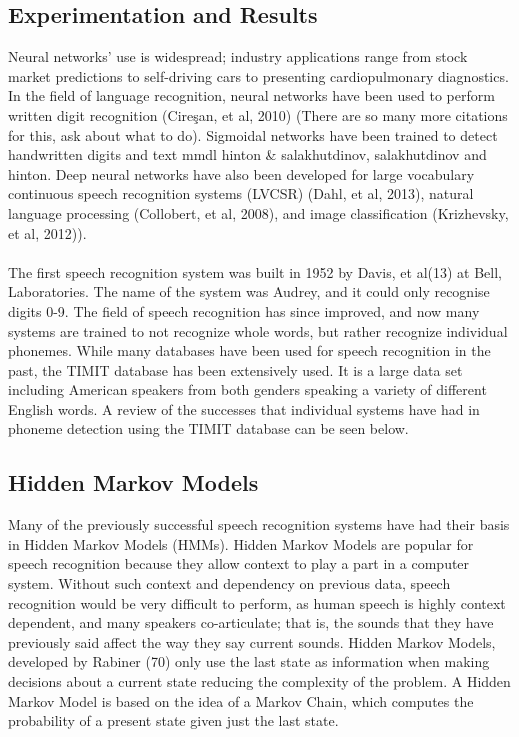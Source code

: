 \documentclass[12pt,twoside]{report}
\begin{document}
		\subsection{Experimentation and Results}

Neural networks’ use is widespread; industry applications range from stock market predictions to self-driving cars to presenting cardiopulmonary diagnostics. In the field of language recognition, neural networks have been used to perform written digit recognition (Cireşan, et al, 2010) (There are so many more citations for this, ask about what to do). Sigmoidal networks have been trained to detect handwritten digits and text {mmdl hinton \& salakhutdinov, salakhutdinov and hinton}. Deep neural networks have also been developed for large vocabulary continuous speech recognition systems (LVCSR) (Dahl, et al, 2013), natural language processing (Collobert, et al, 2008), and image classification (Krizhevsky, et al, 2012)). 
\\ \\
	The first speech recognition system was built in 1952 by Davis, et al(13) at Bell, Laboratories. The name of the system was Audrey, and it could only recognise digits 0-9. The field of speech recognition has since improved, and now many systems are trained to not recognize whole words, but rather recognize individual phonemes. While many databases have been used for speech recognition in the past, the TIMIT database has been extensively used. It is a large data set including American speakers from both genders speaking a variety of different English words. A review of the successes that individual systems have had in phoneme detection using the TIMIT database can be seen below. 
	\subsection{Hidden Markov Models}
Many of the previously successful speech recognition systems have had their basis in Hidden Markov Models (HMMs). Hidden Markov Models are popular for speech recognition because they allow context to play a part in a computer system. Without such context and dependency on previous data, speech recognition would be very difficult to perform, as human speech is highly context dependent, and many speakers co-articulate; that is, the sounds that they have previously said affect the way they say current sounds. Hidden Markov Models, developed by Rabiner (70) only use the last state as information when making decisions about a current state reducing the complexity of the problem. A Hidden Markov Model is based on the idea of a Markov Chain, which computes the probability of a present state given just the last state. 
\end{document}
